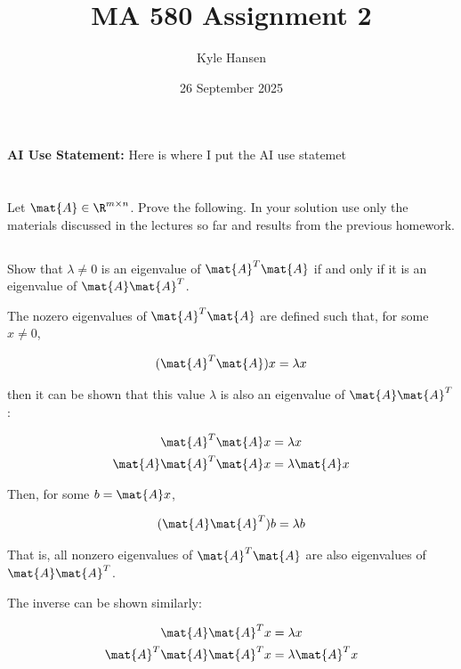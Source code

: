 \documentclass{template}
\title{MA 580 Assignment 2}
\author{Kyle Hansen}
\date{26 September 2025}
\begin{document}
\maketitle

\textbf{AI Use Statement: }Here is where I put the AI use statemet

\section{}

Let $\mat{A} \in \R^{m \times n}$. 
Prove the following. 
In your solution 
use only the materials discussed in the lectures so far and results 
from the previous homework.

\subsection{}
Show that $\lambda \neq 0$ is an eigenvalue of $\mat{A}^T \mat{A}$ if and 
only if it is an eigenvalue of $\mat{A}\mat{A}^T$.

The nozero eigenvalues of $\mat{A}^T \mat{A}$ are defined such that, for some $x \neq 0$,

\begin{equation}
    (\mat{A}^T \mat{A})x = \lambda x
\end{equation}

then it can be shown that this value $\lambda$ is also an eigenvalue of $\mat{A}\mat{A}^T $:

\begin{equation}
    \begin{aligned}
    \mat{A}^T \mat{A}x &= \lambda x\\
    \mat{A}\mat{A}^T \mat{A}x &= \lambda \mat{A} x\\
    \end{aligned}
\end{equation}

Then, for some $b = \mat{A}x$, 

\begin{equation}
    (\mat{A}\mat{A}^T )b = \lambda b
\end{equation}

That is, all nonzero eigenvalues of $\mat{A}^T \mat{A}$ are also eigenvalues of $\mat{A}\mat{A}^T$.

The inverse can be shown similarly:

\begin{equation}
    \begin{aligned}
    \mat{A}\mat{A}^T x &= \lambda x\\
    \mat{A}^T \mat{A}\mat{A}^Tx &= \lambda \mat{A}^T x\\
    \end{aligned}
\end{equation}
\end{document}
